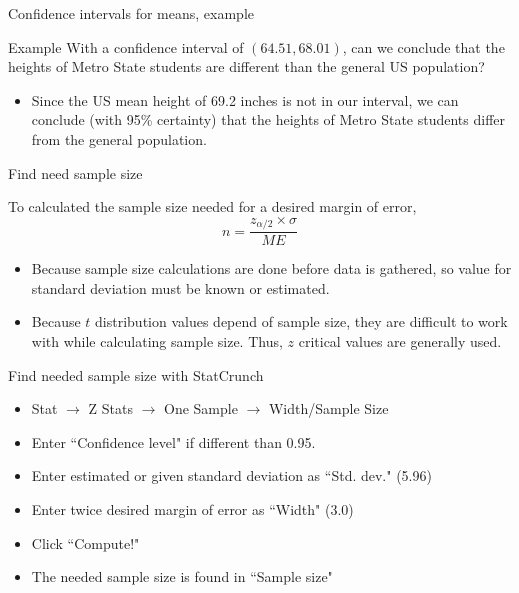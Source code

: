 \documentclass[xcolor=table, handout]{beamer}
\begin{document}
\begin{frame}{Confidence intervals for means, example}
\begin{exampleblock}{Example}
With a confidence interval of $(64.51, 68.01)$, can we conclude that the heights of Metro State students are different than the general US population?
\begin{itemize}
\pause\item Since the US mean height of 69.2 inches is not in our interval, we can conclude (with 95\% certainty) that the heights of Metro State students differ from the general population.
\end{itemize}
\end{exampleblock}
\end{frame}


\begin{frame}{Find need sample size}
\begin{block}{}
To calculated the sample size needed for a desired margin of error,
\[n = \frac{z_{\alpha/2} \times \sigma}{ME}\]
\begin{itemize}
\pause\item Because sample size calculations are done before data is gathered, so value for standard deviation must be known or estimated.
\pause\item Because $t$ distribution values depend of sample size, they are difficult to work with while calculating sample size. Thus, $z$ critical values are generally used.
\end{itemize}
\end{block}
\end{frame}

\begin{frame}{Find needed sample size with StatCrunch}
\begin{block}{}
\begin{itemize}
\item Stat $\to$ Z Stats $\to$ One Sample $\to$ Width/Sample Size
\item Enter ``Confidence level" if different than 0.95.
\item Enter estimated or given standard deviation as ``Std. dev." (5.96)
\item Enter twice desired margin of error as ``Width" (3.0)
\item Click ``Compute!"
\item The needed sample size is found in ``Sample size"
\end{itemize}
\end{block}

\end{frame}
\end{document}
